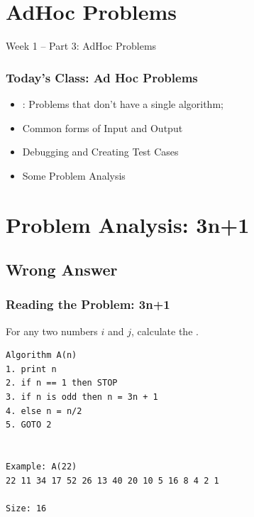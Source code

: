

\section{AdHoc Problems}

\begin{frame}
  \centering
  {\huge
    Week 1 -- Part 3: AdHoc Problems
  }
\end{frame}

\begin{frame}
  \frametitle{Today's Class: Ad Hoc Problems}

  \begin{itemize}
  \item {}: Problems that don't have a single algorithm;
  \bigskip

  \item Common forms of Input and Output
  \bigskip

  \item Debugging and Creating Test Cases
  \bigskip

  \item Some Problem Analysis
  \end{itemize}

\end{frame}

\section{Problem Analysis: 3n+1}
\subsection{Wrong Answer}
\begin{frame}[fragile]
  \frametitle{Reading the Problem: 3n+1}

  \begin{block}{}
    For any two numbers $i$ and $j$, calculate the .
  \end{block}

  \bigskip

\begin{verbatim}
Algorithm A(n)
1. print n
2. if n == 1 then STOP
3. if n is odd then n = 3n + 1
4. else n = n/2
5. GOTO 2


Example: A(22)
22 11 34 17 52 26 13 40 20 10 5 16 8 4 2 1

Size: 16
\end{verbatim}
\end{frame}

